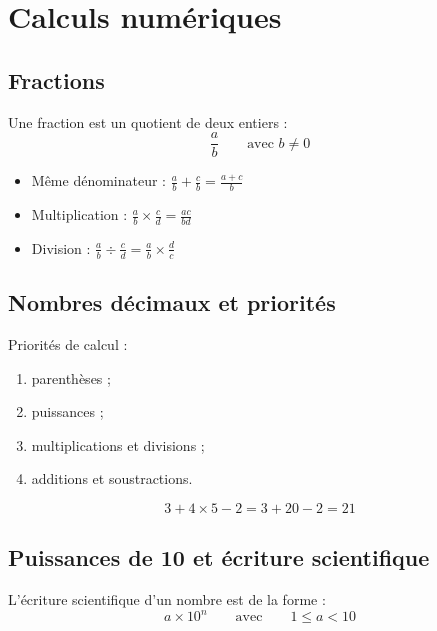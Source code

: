 \documentclass[11pt,a4paper,twoside]{book}
\begin{document}
\chapter{Calculs numériques}

\section{Fractions}
\begin{definitionbox}
Une fraction est un quotient de deux entiers :
\[
\frac{a}{b}\qquad \text{avec } b\neq 0
\]
\end{definitionbox}

\begin{methodebox}
\begin{itemize}
\item Même dénominateur : \(\frac{a}{b}+\frac{c}{b}=\frac{a+c}{b}\)
\item Multiplication : \(\frac{a}{b}\times\frac{c}{d}=\frac{ac}{bd}\)
\item Division : \(\frac{a}{b}\div\frac{c}{d}=\frac{a}{b}\times\frac{d}{c}\)
\end{itemize}
\end{methodebox}

\section{Nombres décimaux et priorités}
\begin{definitionbox}
Priorités de calcul :
\begin{enumerate}
\item parenthèses ;
\item puissances ;
\item multiplications et divisions ;
\item additions et soustractions.
\end{enumerate}
\end{definitionbox}

\begin{exemplebox}
\[
3+4\times 5-2=3+20-2=21
\]
\end{exemplebox}

\section{Puissances de 10 et écriture scientifique}
\begin{definitionbox}
L'écriture scientifique d'un nombre est de la forme :
\[
a\times 10^n
\qquad \text{avec} \qquad 1\le a < 10
\]
\end{definitionbox}
\end{document}
